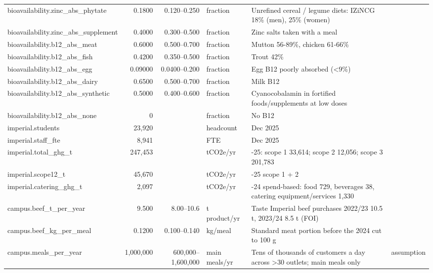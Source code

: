 \begin{longtable}{>{\raggedright\arraybackslash}p{4.2cm}rr>{\raggedright\arraybackslash}p{2.2cm}>{\raggedright\arraybackslash}p{5.4cm}l}
bioavailability.zinc\_abs\_phytate & 0.1800 & 0.120--0.250 & fraction & Unrefined cereal / legume diets: IZiNCG 18\% (men), 25\% (women) & \cite{izincg2004} \\
bioavailability.zinc\_abs\_supplement & 0.4000 & 0.300--0.500 & fraction & Zinc salts taken with a meal & \cite{efsa2014zinc} \\
bioavailability.b12\_abs\_meat & 0.6000 & 0.500--0.700 & fraction & Mutton 56-89\%, chicken 61-66\% & \cite{watanabe2007} \\
bioavailability.b12\_abs\_fish & 0.4200 & 0.350--0.500 & fraction & Trout 42\% & \cite{watanabe2007} \\
bioavailability.b12\_abs\_egg & 0.09000 & 0.0400--0.200 & fraction & Egg B12 poorly absorbed (<9\%) & \cite{watanabe2007} \\
bioavailability.b12\_abs\_dairy & 0.6500 & 0.500--0.700 & fraction & Milk B12 & \cite{watanabe2007} \\
bioavailability.b12\_abs\_synthetic & 0.5000 & 0.400--0.600 & fraction & Cyanocobalamin in fortified foods/supplements at low doses & \cite{watanabe2007} \\
bioavailability.b12\_abs\_none & 0 &  & fraction & No B12 &  \\
imperial.students & 23{,}920 &  & headcount & 31 Dec 2025 & \cite{imperial2026stats} \\
imperial.staff\_fte & 8{,}941 &  & FTE & 31 Dec 2025 & \cite{imperial2026stats} \\
imperial.total\_ghg\_t & 247{,}453 &  & tCO2e/yr & 2024-25: scope 1 33,614; scope 2 12,056; scope 3 201,783 & \cite{imperial2025annual} \\
imperial.scope12\_t & 45{,}670 &  & tCO2e/yr & 2024-25 scope 1 + 2 & \cite{imperial2025annual} \\
imperial.catering\_ghg\_t & 2{,}097 &  & tCO2e/yr & 2023-24 spend-based: food 729, beverages 38, catering equipment/services 1,330 & \cite{imperial2024sust} \\
campus.beef\_t\_per\_year & 9.500 & 8.00--10.6 & t product/yr & Taste Imperial beef purchases 2022/23 10.5 t, 2023/24 8.5 t (FOI) & \cite{imperialfoi} \\
campus.beef\_kg\_per\_meal & 0.1200 & 0.100--0.140 & kg/meal & Standard meat portion before the 2024 cut to 100 g & \cite{imperial2026progress} \\
campus.meals\_per\_year & 1{,}000{,}000 & 600{,}000--1{,}600{,}000 & main meals/yr & Tens of thousands of customers a day across >30 outlets; main meals only & assumption \\

\end{longtable}
